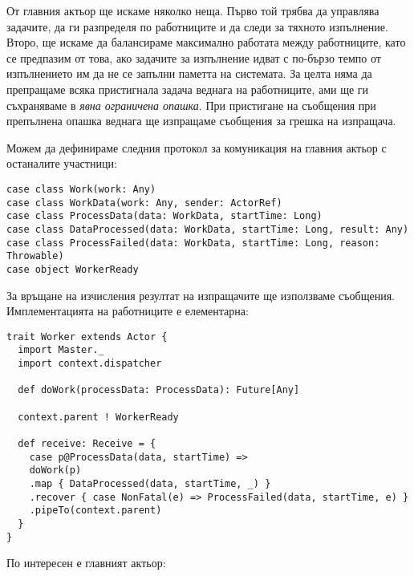 От главния актьор ще искаме няколко неща. Първо той трябва да управлява задачите, да ги разпределя по работниците и да следи за тяхното изпълнение. Второ, ще искаме да балансираме максимално работата между работниците, като се предпазим от това, ако задачите за изпълнение идват с по-бързо темпо от изпълнението им да не се запълни паметта на системата. За целта няма да препращаме всяка пристигнала задача веднага на работниците, ами ще ги съхраняваме в \emph{явна ограничена опашка}. При пристигане на съобщения при препълнена опашка веднага ще изпращаме съобщения за грешка на изпращача.

Можем да дефинираме следния протокол за комуникация на главния актьор с останалите участници:

\begin{lstlisting}
case class Work(work: Any)
case class WorkData(work: Any, sender: ActorRef)
case class ProcessData(data: WorkData, startTime: Long)
case class DataProcessed(data: WorkData, startTime: Long, result: Any)
case class ProcessFailed(data: WorkData, startTime: Long, reason: Throwable)
case object WorkerReady
\end{lstlisting}

За връщане на изчисления резултат на изпращачите ще използваме  съобщения. Имплементацията на работниците е елементарна:

\begin{lstlisting}
trait Worker extends Actor {
  import Master._
  import context.dispatcher
  
  def doWork(processData: ProcessData): Future[Any]
  
  context.parent ! WorkerReady
  
  def receive: Receive = {
    case p@ProcessData(data, startTime) =>
    doWork(p)
    .map { DataProcessed(data, startTime, _) }
    .recover { case NonFatal(e) => ProcessFailed(data, startTime, e) }
    .pipeTo(context.parent)
  }
}
\end{lstlisting}

По интересен е главният актьор:

